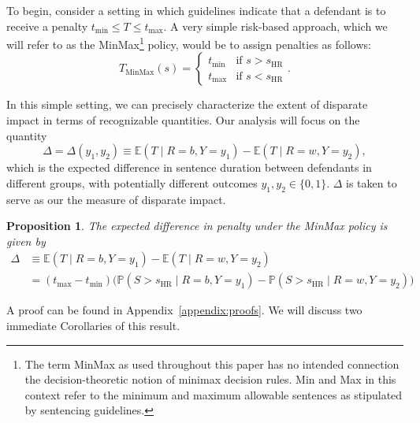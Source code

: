 \documentclass[11pt, svgnames]{article}
\newcommand{\E}{\mathbb{E}}
\renewcommand{\P}{\mathbb{P}}
\numberwithin{equation}{section}
\theoremstyle{plain}
\newtheorem{prop}{Proposition}
\theoremstyle{definition}
\numberwithin{prop}{section}
\numberwithin{corollary}{section}
\begin{document}
To begin, consider a setting in which guidelines indicate that a defendant is to receive a penalty $t_\mathrm{min} \le T \le t_\mathrm{max}$.  A very simple risk-based approach, which we will refer to as the MinMax\footnote{The term MinMax as used throughout this paper has no intended connection the decision-theoretic notion of minimax decision rules.  Min and Max in this context refer to the minimum and maximum allowable sentences as stipulated by sentencing guidelines.} policy, would be to assign penalties as follows:
\begin{equation}
 T_{\mathrm{MinMax}}(s) =  \begin{cases}
      t_{\mathrm{min}} & \text{if } s > s_\mathrm{HR} \\
      t_{\mathrm{max}} & \text{if } s < s_\mathrm{HR}
      \end{cases}.
\end{equation}

In this simple setting, we can precisely characterize the extent of disparate impact in terms of recognizable quantities. Our analysis will focus on the quantity 
\[
\Delta = \Delta(y_1, y_2) \equiv \E(T \mid R = b, Y = y_1) - \E(T \mid R = w, Y = y_2),
\]
which is the expected difference in sentence duration between defendants in different groups, with potentially different outcomes $y_1, y_2 \in \{0, 1\}$.  $\Delta$ is taken to serve as our the measure of disparate impact.

\begin{prop}
  The expected difference in penalty under the MinMax policy is given by
  \begin{align*}
  \Delta &\equiv \E(T \mid R = b, Y = y_1) - \E(T \mid R = w, Y = y_2) \\ 
  &= (t_\mathrm{max}- t_\mathrm{min})\big(\P(S > s_\mathrm{HR} \mid R = b, Y = y_1) - \P(S > s_\mathrm{HR} \mid R = w, Y = y_2)\big)
  \end{align*}
  \label{prop:main}
\end{prop}

\vspace{-2em}
\noindent  A proof can be found in Appendix~\ref{appendix:proofs}. We will discuss two immediate Corollaries of this result.
\end{document}
